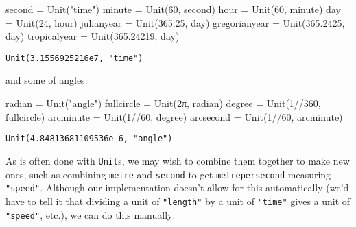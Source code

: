 \documentclass[
  letterpaper,
  DIV=11,
  numbers=noendperiod]{scrreprt}
\newenvironment{Shaded}{\begin{snugshade}}{\end{snugshade}}
\newcommand{\FloatTok}[1]{\textcolor[rgb]{0.68,0.00,0.00}{#1}}
\newcommand{\FunctionTok}[1]{\textcolor[rgb]{0.28,0.35,0.67}{#1}}
\newcommand{\NormalTok}[1]{\textcolor[rgb]{0.00,0.23,0.31}{#1}}
\newcommand{\OperatorTok}[1]{\textcolor[rgb]{0.37,0.37,0.37}{#1}}
\newcommand{\StringTok}[1]{\textcolor[rgb]{0.13,0.47,0.30}{#1}}
\begin{document}
\begin{Shaded}
\begin{Highlighting}[]
\NormalTok{second }\OperatorTok{=} \FunctionTok{Unit}\NormalTok{(}\StringTok{"time"}\NormalTok{)}
\NormalTok{minute }\OperatorTok{=} \FunctionTok{Unit}\NormalTok{(}\FloatTok{60}\NormalTok{, second)}
\NormalTok{hour }\OperatorTok{=} \FunctionTok{Unit}\NormalTok{(}\FloatTok{60}\NormalTok{, minute)}
\NormalTok{day }\OperatorTok{=} \FunctionTok{Unit}\NormalTok{(}\FloatTok{24}\NormalTok{, hour)}
\NormalTok{julianyear }\OperatorTok{=} \FunctionTok{Unit}\NormalTok{(}\FloatTok{365.25}\NormalTok{, day)}
\NormalTok{gregorianyear }\OperatorTok{=} \FunctionTok{Unit}\NormalTok{(}\FloatTok{365.2425}\NormalTok{, day)}
\NormalTok{tropicalyear }\OperatorTok{=} \FunctionTok{Unit}\NormalTok{(}\FloatTok{365.24219}\NormalTok{, day)}
\end{Highlighting}
\end{Shaded}

\begin{verbatim}
Unit(3.1556925216e7, "time")
\end{verbatim}

and some of angles:

\begin{Shaded}
\begin{Highlighting}[]
\NormalTok{radian }\OperatorTok{=} \FunctionTok{Unit}\NormalTok{(}\StringTok{"angle"}\NormalTok{)}
\NormalTok{fullcircle }\OperatorTok{=} \FunctionTok{Unit}\NormalTok{(}\FloatTok{2}\NormalTok{π, radian)}
\NormalTok{degree }\OperatorTok{=} \FunctionTok{Unit}\NormalTok{(}\FloatTok{1}\OperatorTok{//}\FloatTok{360}\NormalTok{, fullcircle)}
\NormalTok{arcminute }\OperatorTok{=} \FunctionTok{Unit}\NormalTok{(}\FloatTok{1}\OperatorTok{//}\FloatTok{60}\NormalTok{, degree)}
\NormalTok{arcsecond }\OperatorTok{=} \FunctionTok{Unit}\NormalTok{(}\FloatTok{1}\OperatorTok{//}\FloatTok{60}\NormalTok{, arcminute)}
\end{Highlighting}
\end{Shaded}

\begin{verbatim}
Unit(4.84813681109536e-6, "angle")
\end{verbatim}

As is often done with \texttt{Unit}s, we may wish to combine them
together to make new ones, such as combining \texttt{metre} and
\texttt{second} to get \texttt{metrepersecond} measuring
\texttt{"speed"}. Although our implementation doesn't allow for this
automatically (we'd have to tell it that dividing a unit of
\texttt{"length"} by a unit of \texttt{"time"} gives a unit of
\texttt{"speed"}, etc.), we can do this manually:
\end{document}
